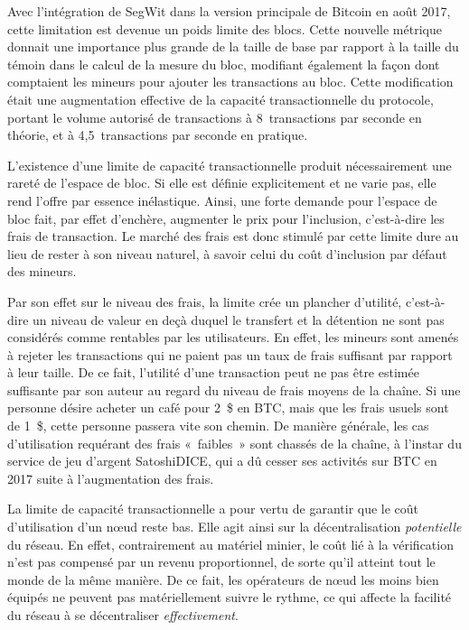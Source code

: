 Avec l'intégration de SegWit dans la version principale de Bitcoin en août 2017, cette limitation est devenue un poids limite des blocs. Cette nouvelle métrique donnait une importance plus grande de la taille de base par rapport à la taille du témoin dans le calcul de la mesure du bloc, modifiant également la façon dont comptaient les mineurs pour ajouter les transactions au bloc. Cette modification était une augmentation effective de la capacité transactionnelle du protocole, portant le volume autorisé de transactions à 8~transactions par seconde en théorie, et à 4,5~transactions par seconde en pratique. %

L'existence d'une limite de capacité transactionnelle produit nécessairement une rareté de l'espace de bloc. Si elle est définie explicitement et ne varie pas, elle rend l'offre par essence inélastique. Ainsi, une forte demande pour l'espace de bloc fait, par effet d'enchère, augmenter le prix pour l'inclusion, c'est-à-dire les frais de transaction. Le marché des frais est donc stimulé par cette limite dure au lieu de rester à son niveau naturel, à savoir celui du coût d'inclusion par défaut des mineurs.

Par son effet sur le niveau des frais, la limite crée un plancher d'utilité, c'est-à-dire un niveau de valeur en deçà duquel le transfert et la détention ne sont pas considérés comme rentables par les utilisateurs. En effet, les mineurs sont amenés à rejeter les transactions qui ne paient pas un taux de frais suffisant par rapport à leur taille. De ce fait, l'utilité d'une transaction peut ne pas être estimée suffisante par son auteur au regard du niveau de frais moyens de la chaîne. Si une personne désire acheter un café pour 2~\$ en BTC, mais que les frais usuels sont de 1~\$, cette personne passera vite son chemin. De manière générale, les cas d'utilisation requérant des frais «~faibles~» sont chassés de la chaîne, à l'instar du service de jeu d'argent SatoshiDICE, qui a dû cesser ses activités sur BTC en 2017 suite à l'augmentation des frais.

La limite de capacité transactionnelle a pour vertu de garantir que le coût d'utilisation d'un nœud reste bas. Elle agit ainsi sur la décentralisation \emph{potentielle} du réseau. En effet, contrairement au matériel minier, le coût lié à la vérification n'est pas compensé par un revenu proportionnel, de sorte qu'il atteint tout le monde de la même manière. De ce fait, les opérateurs de nœud les moins bien équipés ne peuvent pas matériellement suivre le rythme, ce qui affecte la facilité du réseau à se décentraliser \emph{effectivement}. %

